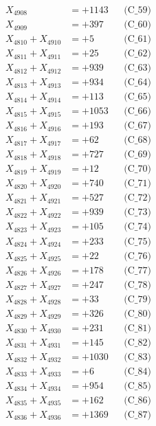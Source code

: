 \documentclass[a4paper,10pt]{article}
\begin{document}
{\begin{align}
X_{4908} &= +1143 && \text{(C\_59)} \\
X_{4909} &= +397 && \text{(C\_60)} \\
\allowbreak
X_{4810} + X_{4910} &= +5 && \text{(C\_61)} \\
X_{4811} + X_{4911} &= +25 && \text{(C\_62)} \\
X_{4812} + X_{4912} &= +939 && \text{(C\_63)} \\
X_{4813} + X_{4913} &= +934 && \text{(C\_64)} \\
X_{4814} + X_{4914} &= +113 && \text{(C\_65)} \\
\allowbreak
X_{4815} + X_{4915} &= +1053 && \text{(C\_66)} \\
X_{4816} + X_{4916} &= +193 && \text{(C\_67)} \\
X_{4817} + X_{4917} &= +62 && \text{(C\_68)} \\
X_{4818} + X_{4918} &= +727 && \text{(C\_69)} \\
X_{4819} + X_{4919} &= +12 && \text{(C\_70)} \\
\allowbreak
X_{4820} + X_{4920} &= +740 && \text{(C\_71)} \\
X_{4821} + X_{4921} &= +527 && \text{(C\_72)} \\
X_{4822} + X_{4922} &= +939 && \text{(C\_73)} \\
X_{4823} + X_{4923} &= +105 && \text{(C\_74)} \\
X_{4824} + X_{4924} &= +233 && \text{(C\_75)} \\
\allowbreak
X_{4825} + X_{4925} &= +22 && \text{(C\_76)} \\
X_{4826} + X_{4926} &= +178 && \text{(C\_77)} \\
X_{4827} + X_{4927} &= +247 && \text{(C\_78)} \\
X_{4828} + X_{4928} &= +33 && \text{(C\_79)} \\
X_{4829} + X_{4929} &= +326 && \text{(C\_80)} \\
\allowbreak
X_{4830} + X_{4930} &= +231 && \text{(C\_81)} \\
X_{4831} + X_{4931} &= +145 && \text{(C\_82)} \\
X_{4832} + X_{4932} &= +1030 && \text{(C\_83)} \\
X_{4833} + X_{4933} &= +6 && \text{(C\_84)} \\
X_{4834} + X_{4934} &= +954 && \text{(C\_85)} \\
\allowbreak
X_{4835} + X_{4935} &= +162 && \text{(C\_86)} \\
X_{4836} + X_{4936} &= +1369 && \text{(C\_87)} \\

\end{align}}
\end{document}
